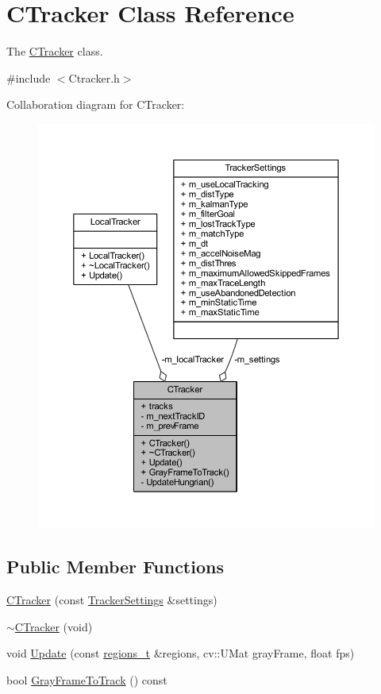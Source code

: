 \hypertarget{class_c_tracker}{}\section{C\+Tracker Class Reference}
\label{class_c_tracker}


The \mbox{\hyperlink{class_c_tracker}{C\+Tracker}} class.  




{\ttfamily \#include $<$Ctracker.\+h$>$}



Collaboration diagram for C\+Tracker\+:\nopagebreak
\begin{figure}[H]
\begin{center}
\leavevmode
\includegraphics[width=350pt]{class_c_tracker__coll__graph}
\end{center}
\end{figure}
\subsection*{Public Member Functions}
\begin{DoxyCompactItemize}
\item 
\mbox{\hyperlink{class_c_tracker_a37a89d416c0a9f234b20849667a154c4}{C\+Tracker}} (const \mbox{\hyperlink{struct_tracker_settings}{Tracker\+Settings}} \&settings)
\item 
\mbox{\hyperlink{class_c_tracker_ab74d4f1ce428c9d3fa9f9e9901a2070a}{$\sim$\+C\+Tracker}} (void)
\item 
void \mbox{\hyperlink{class_c_tracker_aad6f4e7a80a1b71522644a1f8c052f21}{Update}} (const \mbox{\hyperlink{defines_8h_a01db0de56a20f4342820a093c5154536}{regions\+\_\+t}} \&regions, cv\+::\+U\+Mat gray\+Frame, float fps)
\item 
bool \mbox{\hyperlink{class_c_tracker_a9ddba40ad9a0196e1e75f9b9048be4f2}{Gray\+Frame\+To\+Track}} () const
\end{DoxyCompactItemize}
